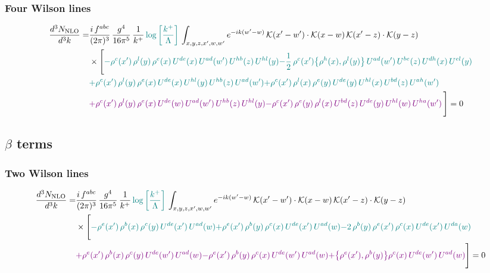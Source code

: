 \documentclass[9pt]{article}
\numberwithin{equation}{section}
\begin{document}
\subsubsection{Four Wilson lines}
\begin{align}
    \frac{d^{3}N_{\rm NLO}}{d^{3}k}= & \frac{i\,f^{abc}}{(2\pi)^{3}}\,\frac{g^{4}}{16\pi^{5}}\,\frac{1}{k^{+}}\,{\color{teal}\log{\left[\frac{k^{+}}{\Lambda}\right]}}\,\int_{x,y,z,x',w,w'}e^{-ik(w'-w)}\,\mathcal{K}(x'-w')\cdot\mathcal{K}(x-w)\,\mathcal{K}(x'-z)\cdot\mathcal{K}(y-z)\notag \\ & \times\Bigg[{\color{teal}-\rho^{c}(x')\,\rho^{l}(y)\,\rho^{e}(x)\,U^{de}(x)\,U^{ad}(w')\,U^{hb}(z)\,U^{hl}(y)}{\color{teal}-\frac{1}{2}\,\rho^{c}(x')\big\{\rho^{h}(x),\rho^{l}(y)\big\}\,U^{ad}(w')\,U^{be}(z)\,U^{dh}(x)\,U^{el}(y)}\notag \\ & {\color{teal}+\rho^{c}(x')\,\rho^{l}(y)\,\rho^{e}(x)\,U^{de}(x)\,U^{hl}(y)\,U^{hb}(z)\,U^{ad}(w')}{\color{teal}+\rho^{c}(x')\,\rho^{l}(x)\,\rho^{e}(y)\,U^{de}(y)\,U^{hl}(x)\,U^{bd}(z)\,U^{ah}(w')}\notag \\ &{\color{violet}+\rho^{c}(x')\,\rho^{l}(y)\,\rho^{e}(x)\,U^{de}(w)\,U^{ad}(w')\,U^{hb}(z)\,U^{hl}(y)}{\color{violet}-\rho^{c}(x')\,\rho^{e}(y)\,\rho^{l}(x)\,U^{bd}(z)\,U^{de}(y)\,U^{hl}(w)\,U^{ha}(w')}\,\Bigg] = 0
\end{align}
\subsection{$\beta$ terms}
\subsubsection{Two Wilson lines}
\begin{align}
    \frac{d^{3}N_{\rm NLO}}{d^{3}k}= & \frac{i\,f^{abc}}{(2\pi)^{3}}\,\frac{g^{4}}{16\pi^{5}}\,\frac{1}{k^{+}}\,{\color{teal}\log{\left[\frac{k^{+}}{\Lambda}\right]}}\,\int_{x,y,z,x',w,w'}e^{-ik(w'-w)}\,\mathcal{K}(x'-w')\cdot\mathcal{K}(x-w)\,\mathcal{K}(x'-z)\cdot\mathcal{K}(y-z)\notag \\ & \times\Bigg[{\color{teal}-\rho^{e}(x')\,\rho^{b}(x)\,\rho^{c}(y)\,U^{de}(x')\,U^{ad}(w)}{\color{teal}+\rho^{e}(x')\,\rho^{b}(y)\,\rho^{c}(x)\,U^{de}(x')\,U^{ad}(w)}{\color{teal}-2\,\rho^{b}(y)\,\rho^{e}(x')\, \rho^{c}(x)\, U^{de}(x')\,U^{da}(w)}\notag \\ & {\color{violet}+\rho^{e}(x')\,\rho^{b}(x)\,\rho^{c}(y)\,U^{de}(w')\,U^{ad}(w)}{\color{violet}-\rho^{e}(x')\,\rho^{b}(y)\,\rho^{c}(x)\,U^{de}(w')\,U^{ad}(w)}{\color{violet}+\big\{\rho^{e}(x'),\rho^{b}(y)\big\}\rho^{c}(x)\,U^{de}(w')\,U^{ad}(w)}\Bigg] = 0
\end{align}   
\end{document}
